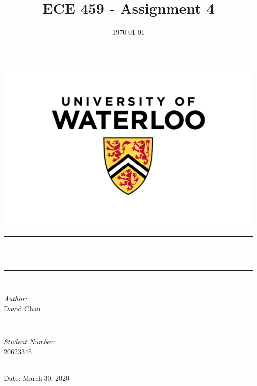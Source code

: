 \documentclass[12pt,reqno]{article}
\title{ECE 459 - Assignment 4} %
\author{}
\date{\today} %
\makeatletter
\let\thetitle\@title
\makeatother
\begin{document}
\newcommand{\units}[1]{$\hspace{0.25em}\mathrm{[#1]}$}


\begin{titlepage}
	\centering
    \vspace*{-1 cm}
    \includegraphics[scale = 0.5]{images/UW.jpg}\\	%
	\rule{\linewidth}{0.2 mm} \\[0.4 cm]
	{ \huge \bfseries \thetitle}\\
	\rule{\linewidth}{0.2 mm} \\[1.5 cm]
	
	\begin{minipage}[t]{0.4\textwidth}
		\begin{flushleft} \large
			\emph{Author:}\\
            David Chau \\
			\end{flushleft}
			\end{minipage}~
			\begin{minipage}[t]{0.4\textwidth}
			\begin{flushright} \large
			\emph{Student Number:} \\
            20623345\\
		\end{flushright}
	\end{minipage}\\[2 cm]
	Date: 
	{\large March 30, 2020}\\[2 cm]
	\vfill
\end{titlepage}
\end{document}
